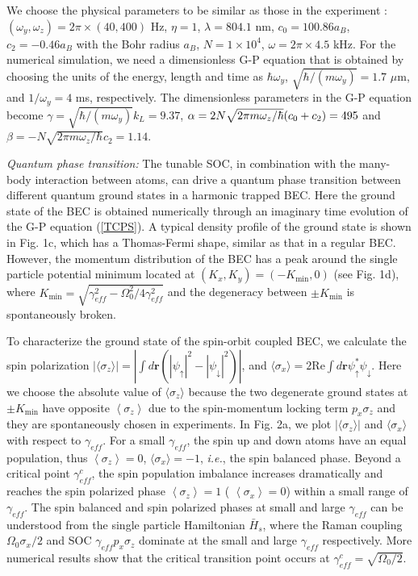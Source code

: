 \documentclass[prl,twocolumn,superscriptaddress,showpacs,floatfix]{revtex4}
\begin{document}
We choose the physical parameters to be similar as those in the experiment
\cite{Lin}: $(\omega _{y},\omega _{z})=2\pi \times (40,400)$ Hz, $\eta =1$, $%
\lambda =804.1$ nm, $c_{0}=100.86a_{B}$, $c_{2}=-0.46a_{B}$ \cite{Widera}
with the Bohr radius $a_{B}$, $N=1\times 10^{4}$, $\omega =2\pi \times 4.5$
kHz. For the numerical simulation, we need a dimensionless G-P equation that
is obtained by choosing the units of the energy, length and time as $\hbar
\omega _{y}$, $\sqrt{\hbar /(m\omega _{y})}=1.7$ $\mu $m, and $1/\omega
_{y}=4$ ms, respectively. The dimensionless parameters in the G-P equation
become $\gamma =\sqrt{\hbar /(m\omega _{y})}k_{L}=9.37$, $\alpha =2N\sqrt{%
2\pi m\omega _{z}/\hbar }(c_{0}+c_{2})=495$ and $\beta =-N\sqrt{2\pi m\omega
_{z}/\hbar }c_{2}=1.14$.

\textit{Quantum phase transition:} The tunable SOC, in combination with the
many-body interaction between atoms, can drive a quantum phase transition
between different quantum ground states in a harmonic trapped BEC. Here the
ground state of the BEC is obtained numerically through an imaginary time
evolution of the G-P equation (\ref{TCPS}). A typical density profile of the
ground state is shown in Fig. 1c, which has a Thomas-Fermi shape, similar as
that in a regular BEC. However, the momentum distribution of the BEC has a
peak around the single particle potential minimum located at $\left(
K_{x},K_{y}\right) =\left( -K_{\min },0\right) $ (see Fig. 1d), where $%
K_{\min }=\sqrt{\gamma _{eff}^{2}-\Omega _{0}^{2}/4\gamma _{eff}^{2}}$ and
the degeneracy between $\pm K_{\min }$ is spontaneously broken.

To characterize the ground state of the spin-orbit coupled BEC, we calculate
the spin polarization $|\langle \sigma _{z}\rangle |=\left\vert \int d%
\mathbf{r}\left( \left\vert \psi _{\uparrow }\right\vert ^{2}-\left\vert
\psi _{\downarrow }\right\vert ^{2}\right) \right\vert $, and $\langle
\sigma _{x}\rangle =2$Re$\int d\mathbf{r}\psi _{\uparrow }^{\ast }\psi
_{\downarrow }$. Here we choose the absolute value of $\langle \sigma
_{z}\rangle $ because the two degenerate ground states at $\pm K_{\min }$
have opposite $\left\langle \sigma _{z}\right\rangle $ due to the
spin-momentum locking term $p_{x}\sigma _{z}$ and they are spontaneously
chosen in experiments. In Fig. 2a, we plot $|\langle \sigma _{z}\rangle |$
and $\langle \sigma _{x}\rangle $ with respect to $\gamma _{eff}$. For a
small $\gamma _{eff}$, the spin up and down atoms have an equal population,
thus $\left\langle \sigma _{z}\right\rangle =0$, $\langle \sigma _{x}\rangle
=-1$, \textit{i.e.}, the spin balanced phase. Beyond a critical point $%
\gamma _{eff}^{c}$, the spin population imbalance increases dramatically and
reaches the spin polarized phase $\left\langle \sigma _{z}\right\rangle =1$ (%
$\left\langle \sigma _{x}\right\rangle =0$) within a small range of $\gamma
_{eff}$. The spin balanced and spin polarized phases at small and large $%
\gamma _{eff}$ can be understood from the single particle Hamiltonian $\bar{H%
}_{s}$, where the Raman coupling $\Omega _{0}\sigma _{x}/2$ and SOC $\gamma
_{eff}p_{x}\sigma _{z}$ dominate at the small and large $\gamma _{eff}$
respectively. More numerical results show that the critical transition point
occurs at $\gamma _{eff}^{c}=\sqrt{\Omega _{0}/2}$.
\end{document}
